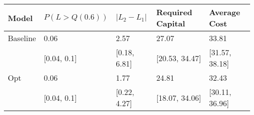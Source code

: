 \begin{tabular}{lllll}
\toprule
    Model & $P(L > Q(0.6))$ & $|L_2 - L_1|$ & Required Capital &    Average Cost \\
\midrule
 Baseline &            0.06 &          2.57 &            27.07 &           33.81 \\
          &     [0.04, 0.1] &  [0.18, 6.81] &   [20.53, 34.47] &  [31.57, 38.18] \\
      Opt &            0.06 &          1.77 &            24.81 &           32.43 \\
          &     [0.04, 0.1] &  [0.22, 4.27] &   [18.07, 34.06] &  [30.11, 36.96] \\
\bottomrule
\end{tabular}
